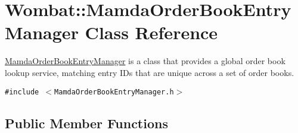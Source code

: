 \hypertarget{classWombat_1_1MamdaOrderBookEntryManager}{
\section{Wombat::Mamda\-Order\-Book\-Entry\-Manager Class Reference}
\label{classWombat_1_1MamdaOrderBookEntryManager}
}
\hyperlink{classWombat_1_1MamdaOrderBookEntryManager}{Mamda\-Order\-Book\-Entry\-Manager} is a class that provides a global order book lookup service, matching entry IDs that are unique across a set of order books.  


{\tt \#include $<$Mamda\-Order\-Book\-Entry\-Manager.h$>$}

\subsection*{Public Member Functions}
